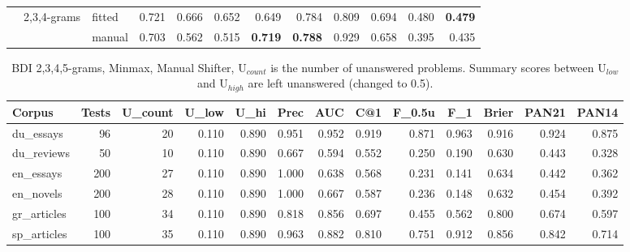 \documentclass[
    hf
]{ceurart}
\begin{document}
\begin{table}
\begin{adjustbox}{max width=\textwidth}
\begin{tabular}{lllrrrrrrrrr}
                                                      & \multirow[c]{2}{*}{ 2,3,4-grams }   & fitted  & 0.721          & 0.666          & 0.652          & 0.649          & 0.784          & 0.809          & 0.694          & 0.480          & \textbf{0.479} \\
                                                      &                                     & manual  & 0.703          & 0.562          & 0.515          & \textbf{0.719} & \textbf{0.788} & 0.929          & 0.658          & 0.395          & 0.435          \\
            \bottomrule
        \end{tabular}
    \end{adjustbox}
\end{table}

\begin{table}
    \caption{BDI 2,3,4,5-grams, Minmax, Manual Shifter, U$_{count}$ is the number of unanswered
    problems. Summary scores between U$_{low}$ and U$_{high}$ are left unanswered (changed to
    0.5).}
    \label{tab:bdi}
    \raggedright
    \begin{adjustbox}{max width=\textwidth}

        \begin{tabular}{lrrrrrrrrrrrr}
            \toprule
            Corpus & Tests & U_{count} & U_{low} & U_{hi} & Prec & AUC & C@1 & F_{0.5u} & F_1 & Brier & PAN21 & PAN14 \\
            \midrule
            du\_essays & 96 & 20 & 0.110 & 0.890 & 0.951 & 0.952 & 0.919 & 0.871 & 0.963 & 0.916 & 0.924 & 0.875 \\
            du\_reviews & 50 & 10 & 0.110 & 0.890 & 0.667 & 0.594 & 0.552 & 0.250 & 0.190 & 0.630 & 0.443 & 0.328 \\
            en\_essays & 200 & 27 & 0.110 & 0.890 & 1.000 & 0.638 & 0.568 & 0.231 & 0.141 & 0.634 & 0.442 & 0.362 \\
            en\_novels & 200 & 28 & 0.110 & 0.890 & 1.000 & 0.667 & 0.587 & 0.236 & 0.148 & 0.632 & 0.454 & 0.392 \\
            gr\_articles & 100 & 34 & 0.110 & 0.890 & 0.818 & 0.856 & 0.697 & 0.455 & 0.562 & 0.800 & 0.674 & 0.597 \\
            sp\_articles & 100 & 35 & 0.110 & 0.890 & 0.963 & 0.882 & 0.810 & 0.751 & 0.912 & 0.856 & 0.842 & 0.714 \\
            \bottomrule
            \end{tabular}
    \end{adjustbox}
\end{table}
\end{document}
